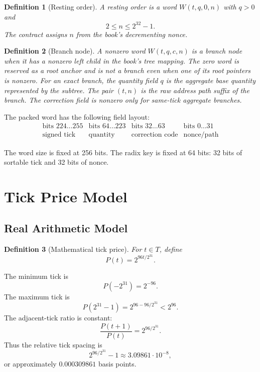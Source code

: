 \documentclass[11pt]{article}
\newtheorem{definition}{Definition}
\begin{document}
\begin{definition}[Resting order]
A resting order is a word \(W(t,q,0,n)\) with \(q>0\) and
\[
  2 \le n \le 2^{32}-1.
\]
The contract assigns \(n\) from the book's decrementing nonce.
\end{definition}

\begin{definition}[Branch node]
A nonzero word \(W(t,q,c,n)\) is a branch node when it has a nonzero left
child in the book's tree mapping.  The zero word is reserved as a root
anchor and is not a branch even when one of its root pointers is
nonzero.  For an exact branch, the quantity field \(q\) is the aggregate
base quantity represented by the subtree.  The pair \((t,n)\) is the
raw address path suffix of the branch.  The correction field is nonzero
only for same-tick aggregate branches.
\end{definition}

The packed word has the following field layout:
\[
\begin{array}{c|c|c|c}
\text{bits }224\ldots255 & \text{bits }64\ldots223
  & \text{bits }32\ldots63 & \text{bits }0\ldots31 \\
\hline
\text{signed tick} & \text{quantity} & \text{correction code}
  & \text{nonce/path}
\end{array}
\]

The word size is fixed at 256 bits.  The radix key is fixed at 64 bits:
32 bits of sortable tick and 32 bits of nonce.

\section{Tick Price Model}

\subsection{Real Arithmetic Model}

\begin{definition}[Mathematical tick price]
For \(t\in T\), define
\[
  P(t) = 2^{96t/2^{31}}.
\]
\end{definition}

The minimum tick is
\[
  P(-2^{31}) = 2^{-96}.
\]
The maximum tick is
\[
  P(2^{31}-1) = 2^{96-96/2^{31}} < 2^{96}.
\]
The adjacent-tick ratio is constant:
\[
  \frac{P(t+1)}{P(t)} = 2^{96/2^{31}}.
\]
Thus the relative tick spacing is
\[
  2^{96/2^{31}}-1 \approx 3.09861\cdot 10^{-8},
\]
or approximately \(0.000309861\) basis points.
\end{document}
